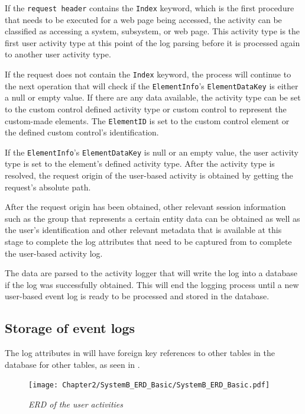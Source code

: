 If the \texttt{request header} contains the \texttt{Index} keyword, which is the first procedure that needs to be executed for a web page being accessed, the activity can be classified as accessing a system, subsystem, or web page. This activity type is the first user activity type at this point of the log parsing before it is processed again to another user activity type. \par If the request does not contain the \texttt{Index} keyword, the process will continue to the next operation that will check if the \texttt{ElementInfo}'s \texttt{ElementDataKey} is either a null or empty value. If there are any data available, the activity type can be set to the custom control defined activity type or custom control to represent the custom-made elements. The \texttt{ElementID} is set to the custom control element or the defined custom control's identification. \par If the \texttt{ElementInfo}'s \texttt{ElementDataKey} is null or an empty value, the user activity type is set to the element's defined activity type. After the activity type is resolved, the request origin of the user-based activity is obtained by getting the request's absolute path.\par After the request origin has been obtained, other relevant session information such as the group that represents a certain entity data can be obtained as well as the user's identification and other relevant metadata that is available at this stage to complete the log attributes that need to be captured from  to complete the user-based activity log.\par The data are parsed to the activity logger that will write the log into a database if the log was successfully obtained. This will end the logging process until a new user-based event log is ready to be processed and stored in the database.

\clearpage

\subsection{Storage of event logs}
The log attributes in  will have foreign key references to other tables in the database for other tables, as seen in . 

\begin{figure}[!htb] %
	\centering %
	\texttt{[image: Chapter2/SystemB\_ERD\_Basic/SystemB\_ERD\_Basic.pdf]}
	\caption[ERD of user activities]
	{\textit{ERD of the user activities}}\label{fig:ch2_erdOfEventLogs}
\end{figure}

